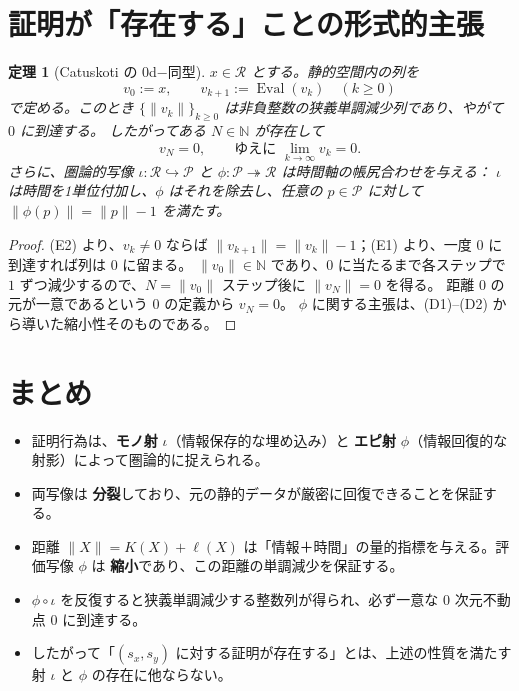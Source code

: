 \documentclass[12pt,a4paper]{article}
\newcommand{\dfix}{\mathfrak{0}}          %
\newcommand{\Rep}{\mathcal{R}}           %
\newcommand{\Prf}{\mathcal{P}}           %
\newtheorem{theorem}{定理}[section]
\begin{document}
\section{証明が「存在する」ことの形式的主張}

\begin{theorem}[Catuskoti の $0$d$-$同型]\label{thm:c4-dfix}
$x\in\Rep$ とする。静的空間内の列を
\[
  v_0:=x,\qquad v_{k+1}:=\operatorname{Eval}(v_k)\quad(k\ge 0)
\]
で定める。このとき $\{\|v_k\|\}_{k\ge0}$ は非負整数の狭義単調減少列であり、やがて $0$ に到達する。
したがってある $N\in\mathbb{N}$ が存在して
\[
  v_N=\dfix,\qquad\text{ゆえに }\lim_{k\to\infty}v_k=\dfix.
\]
さらに、圏論的写像 $\iota:\Rep\hookrightarrow\Prf$ と $\phi:\Prf\twoheadrightarrow\Rep$ は時間軸の帳尻合わせを与える：
$\iota$ は時間を1単位付加し、$\phi$ はそれを除去し、任意の $p\in\Prf$ に対して $\|\phi(p)\|=\|p\|-1$ を満たす。
\end{theorem}
\begin{proof}
(E2) より、$v_k\neq\dfix$ ならば $\|v_{k+1}\|=\|v_k\|-1$；(E1) より、一度 $\dfix$ に到達すれば列は $\dfix$ に留まる。
$\|v_0\|\in\mathbb{N}$ であり、$0$ に当たるまで各ステップで $1$ ずつ減少するので、$N=\|v_0\|$ ステップ後に $\|v_N\|=0$ を得る。
距離 $0$ の元が一意であるという $\dfix$ の定義から $v_N=\dfix$。
$\phi$ に関する主張は、(D1)--(D2) から導いた縮小性そのものである。
\end{proof}

\section{まとめ}

\begin{itemize}[nosep]
  \item 証明行為は、\textbf{モノ射} $\iota$（情報保存的な埋め込み）と \textbf{エピ射} $\phi$（情報回復的な射影）によって圏論的に捉えられる。
  \item 両写像は \textbf{分裂}しており、元の静的データが厳密に回復できることを保証する。
  \item 距離 $\|X\|=K(X)+\ell(X)$ は「情報＋時間」の量的指標を与える。評価写像 $\phi$ は \textbf{縮小}であり、この距離の単調減少を保証する。
  \item $\phi\circ\iota$ を反復すると狭義単調減少する整数列が得られ、必ず一意な $0$ 次元不動点 $\dfix$ に到達する。
  \item したがって「$(s_x,s_y)$ に対する証明が存在する」とは、上述の性質を満たす射 $\iota$ と $\phi$ の存在に他ならない。
\end{itemize}
\end{document}
